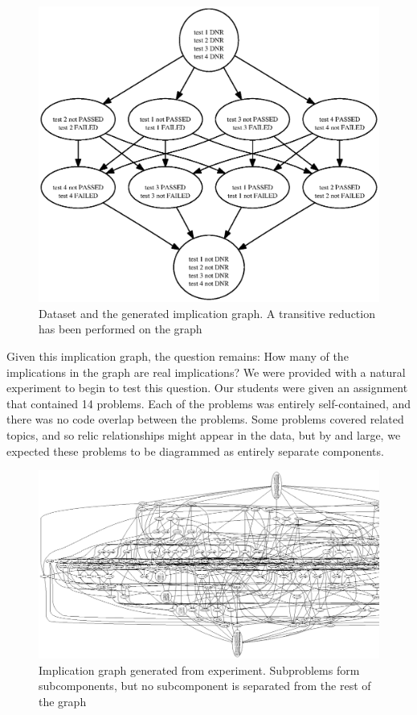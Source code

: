 \documentclass[11pt,twoside]{article}
\theoremstyle{definition}
\begin{document}
\begin{figure}

\includegraphics[width=\textwidth]{toyimpl.ps}
\caption{Dataset and the generated implication graph. A transitive reduction has been performed on the graph}
\end{figure}

Given this implication graph, the question remains: How many of the implications in the graph are real implications? We were provided with a natural experiment to begin to test this question. Our students were given an assignment that contained 14 problems. Each of the problems was entirely self-contained, and there was no code overlap between the problems. Some problems covered related topics, and so relic relationships might appear in the data, but by and large, we expected these problems to be diagrammed as entirely separate components.

\begin{figure}
\includegraphics[width=\textwidth]{div.ps}
\caption{Implication graph generated from experiment. Subproblems form subcomponents, but no subcomponent is separated from the rest of the graph}
\end{figure}
\end{document}
